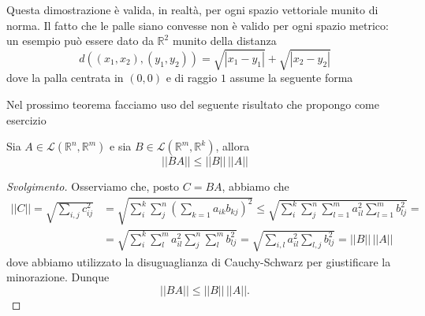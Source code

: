 \begin{remark}
    Questa dimostrazione è valida, in realtà, per ogni spazio vettoriale munito di norma. Il fatto che le palle siano convesse non è valido per ogni spazio metrico: un esempio può essere dato da $\mathbb{R}^2$ munito della distanza
    $$
    d((x_1, x_2), (y_1, y_2)) = \sqrt{|x_1 - y_1|} + \sqrt{|x_2 - y_2|}
    $$
    dove la palla centrata in $(0, 0)$ e di raggio $1$ assume la seguente forma
    
    \begin{figure}[H]
        \centering
    \end{figure}
\end{remark}
Nel prossimo teorema facciamo uso del seguente risultato che propongo come esercizio
\begin{exercise}
    Sia $A \in \mathcal{L}(\mathbb{R}^n, \mathbb{R}^m)$ e sia $B \in \mathcal{L}(\mathbb{R}^m, \mathbb{R}^k)$, allora
    $$
        || BA || \leq || B || \, || A ||
    $$
\end{exercise}
\begin{proof}[Svolgimento]
    Osserviamo che, posto $C = BA$, abbiamo che
    \begin{align*}
    || C || = \sqrt{\sum_{i, j} c_{ij}^2} &= \sqrt{\sum_{i}^k \sum_j^n (\sum_{k=1} a_{ik} b_{kj})^2} \leq \sqrt{\sum_{i}^k \sum_j^n \sum_{l=1}^m a_{il}^2 \sum_{l=1}^m b_{lj}^2} = \\
    &= \sqrt{\sum_i^k \sum_{l}^m a_{il}^2 \sum_{j}^n \sum_{l}^m b_{lj}^2} = \sqrt{\sum_{i, l} a_{il}^2 \sum_{l, j} b_{lj}^2} = || B || \, || A ||
    \end{align*}
    dove abbiamo utilizzato la disuguaglianza di Cauchy-Schwarz per giustificare la minorazione. Dunque
    $$
    || BA || \leq || B || \, || A ||.
    $$
\end{proof}
